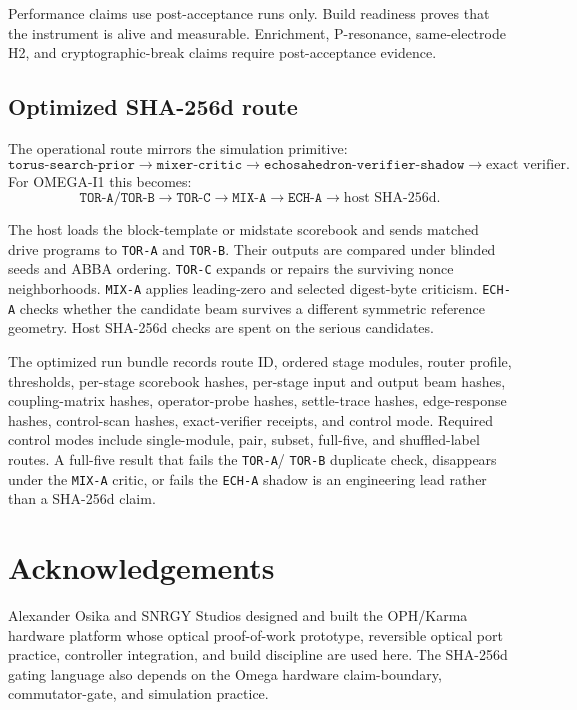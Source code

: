 \documentclass[11pt]{article}
\theoremstyle{definition}
\theoremstyle{remark}
\begin{document}
Performance claims use post-acceptance runs only. Build readiness proves that
the instrument is alive and measurable. Enrichment,
P-resonance, same-electrode H2, and cryptographic-break claims require
post-acceptance evidence.

\subsection{Optimized SHA-256d route}

The operational route mirrors the simulation primitive:
\[
\texttt{torus-search-prior}
\to
\texttt{mixer-critic}
\to
\texttt{echosahedron-verifier-shadow}
\to
\text{exact verifier}.
\]
For OMEGA-I1 this becomes:
\[
\texttt{TOR-A/TOR-B}
\to
\texttt{TOR-C}
\to
\texttt{MIX-A}
\to
\texttt{ECH-A}
\to
\text{host SHA-256d}.
\]

The host loads the block-template or midstate scorebook and sends matched drive
programs to \texttt{TOR-A} and \texttt{TOR-B}. Their outputs are compared under
blinded seeds and ABBA ordering. \texttt{TOR-C} expands or repairs the surviving
nonce neighborhoods. \texttt{MIX-A} applies leading-zero and
selected digest-byte criticism. \texttt{ECH-A} checks whether the candidate beam
survives a different symmetric reference geometry. Host SHA-256d checks are
spent on the serious candidates.

The optimized run bundle records route ID, ordered stage modules, router
profile, thresholds, per-stage scorebook hashes, per-stage input and output beam
hashes, coupling-matrix hashes, operator-probe hashes, settle-trace hashes,
edge-response hashes, control-scan hashes, exact-verifier receipts, and control
mode. Required control modes include single-module, pair, subset, full-five, and
shuffled-label routes. A full-five result that fails the \texttt{TOR-A}/
\texttt{TOR-B} duplicate check, disappears under the \texttt{MIX-A} critic, or
fails the \texttt{ECH-A} shadow is an engineering lead rather than a SHA-256d
claim.

\section*{Acknowledgements}

Alexander Osika and SNRGY Studios designed and built the OPH/Karma hardware
platform whose optical proof-of-work prototype, reversible optical port
practice, controller integration, and build discipline are used here. The
SHA-256d gating language also depends on the Omega hardware claim-boundary,
commutator-gate, and simulation practice.
\end{document}
